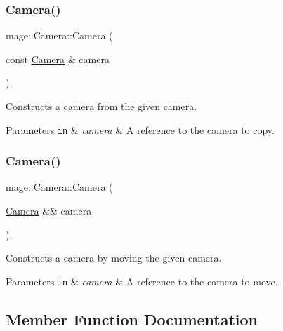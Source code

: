 \subsubsection{\texorpdfstring{Camera()}{Camera()}\hspace{0.1cm}{\footnotesize\ttfamily [2/3]}}
{\footnotesize\ttfamily mage\+::\+Camera\+::\+Camera (\begin{DoxyParamCaption}\item[{const \hyperlink{classmage_1_1_camera}{Camera} \&}]{camera }\end{DoxyParamCaption})\hspace{0.3cm}{\ttfamily [protected]}, {\ttfamily [default]}}

Constructs a camera from the given camera.


\begin{DoxyParams}[1]{Parameters}
\mbox{\tt in}  & {\em camera} & A reference to the camera to copy. \\
\hline
\end{DoxyParams}
\hypertarget{classmage_1_1_camera_a4dc6f31c108b28abe9580ef6d7a06713}{}\label{classmage_1_1_camera_a4dc6f31c108b28abe9580ef6d7a06713} 
\subsubsection{\texorpdfstring{Camera()}{Camera()}\hspace{0.1cm}{\footnotesize\ttfamily [3/3]}}
{\footnotesize\ttfamily mage\+::\+Camera\+::\+Camera (\begin{DoxyParamCaption}\item[{\hyperlink{classmage_1_1_camera}{Camera} \&\&}]{camera }\end{DoxyParamCaption})\hspace{0.3cm}{\ttfamily [protected]}, {\ttfamily [default]}}

Constructs a camera by moving the given camera.


\begin{DoxyParams}[1]{Parameters}
\mbox{\tt in}  & {\em camera} & A reference to the camera to move. \\
\hline
\end{DoxyParams}


\subsection{Member Function Documentation}
\hypertarget{classmage_1_1_camera_a830e9a071449f1026fd43fcd19577e6c}{}\label{classmage_1_1_camera_a830e9a071449f1026fd43fcd19577e6c} 
